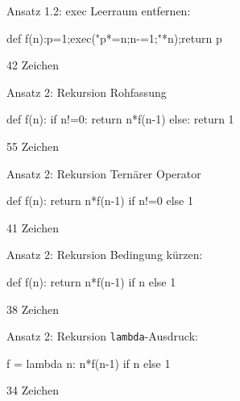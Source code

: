 \documentclass[xcolor=dvipsnames, aspectratio=43, 14pt]{beamer}
\begin{document}
\begin{frame}[fragile]{Ansatz 1.2: exec}
	Leerraum entfernen:
	
	\vfill
	
	\begin{python3code}
	def f(n):p=1;exec("p*=n;n-=1;"*n);return p
	\end{python3code}
	
	\vfill
	
	42 Zeichen
\end{frame}







\begin{frame}[fragile]{Ansatz 2: Rekursion}
	Rohfassung
	
	\vfill
	
	\begin{python3code}
	def f(n):
	   if n!=0:
	      return n*f(n-1)
	   else:
	      return 1
	\end{python3code}
	\vfill
	
	55 Zeichen
\end{frame}

\begin{frame}[fragile]{Ansatz 2: Rekursion}
	Ternärer Operator
	
	\vfill
	
	\begin{python3code}
	def f(n):
	   return n*f(n-1) if n!=0 else 1
	\end{python3code}
	\vfill
	
	41 Zeichen
\end{frame}

\begin{frame}[fragile]{Ansatz 2: Rekursion}
	Bedingung kürzen:
	
	\vfill
	
	\begin{python3code}
	def f(n):
	   return n*f(n-1) if n else 1
	\end{python3code}
	\vfill
	
	38 Zeichen
\end{frame}

\begin{frame}[fragile]{Ansatz 2: Rekursion}
	\texttt{lambda}-Ausdruck:
	
	\vfill
	
	\begin{python3code}
	f = lambda n: n*f(n-1) if n else 1
	\end{python3code}
	\vfill
	
	34 Zeichen
\end{frame}
\end{document}
